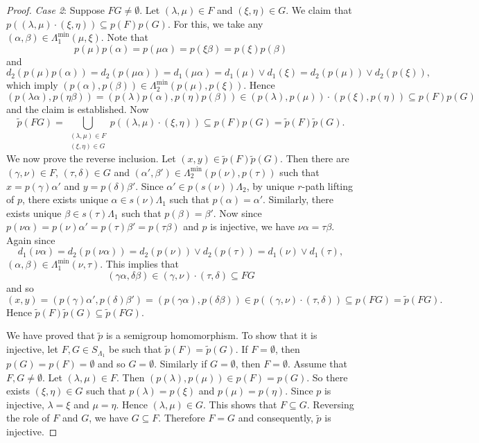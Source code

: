 \documentclass[a4paper,reqno,11pt]{amsart}
\numberwithin{equation}{section}
\theoremstyle{definition}
\theoremstyle{remark}
\begin{document}
\begin{proof}
\emph{Case 2}: Suppose $FG\neq \emptyset$. Let $(\lambda,\mu)\in F$ and $(\xi,\eta)\in G$. We claim that $p\left((\lambda,\mu)\cdot (\xi,\eta)\right)\subseteq p(F)p(G)$. For this, we take any $(\alpha,\beta)\in \Lambda_1^{\min}(\mu,\xi)$. Note that \[p(\mu)p(\alpha)=p(\mu\alpha)=p(\xi\beta)=p(\xi)p(\beta)\] and \[d_2(p(\mu)p(\alpha))=d_2(p(\mu\alpha))=d_1(\mu\alpha)=d_1(\mu)\vee d_1(\xi)=d_2(p(\mu))\vee d_2(p(\xi)),\] which imply $(p(\alpha),p(\beta))\in \Lambda_2^{\min}(p(\mu),p(\xi))$. Hence \[(p(\lambda\alpha),p(\eta\beta))=(p(\lambda)p(\alpha),p(\eta)p(\beta))\in (p(\lambda),p(\mu))\cdot (p(\xi),p(\eta))\subseteq p(F)p(G)\] and the claim is established. Now \[\tilde{p}(FG)=\displaystyle{\bigcup_{\substack{(\lambda,\mu)\in F\\(\xi,\eta)\in G}}}p\left((\lambda,\mu)\cdot (\xi,\eta)\right)\subseteq p(F)p(G)=\tilde{p}(F)\tilde{p}(G).\] We now prove the reverse inclusion. Let $(x,y)\in \tilde{p}(F)\tilde{p}(G)$. Then there are $(\gamma,\nu)\in F$, $(\tau,\delta)\in G$ and $(\alpha',\beta')\in \Lambda_2^{\min}(p(\nu),p(\tau))$ such that $x=p(\gamma)\alpha'$ and $y=p(\delta)\beta'$. Since $\alpha'\in p(s(\nu))\Lambda_2$, by unique $r$-path lifting of $p$, there exists unique $\alpha\in s(\nu)\Lambda_1$ such that $p(\alpha)=\alpha'$. Similarly, there exists unique $\beta\in s(\tau)\Lambda_1$ such that $p(\beta)=\beta'$. Now since $p(\nu\alpha)=p(\nu)\alpha'=p(\tau)\beta'=p(\tau\beta)$ and $p$ is injective, we have $\nu\alpha=\tau\beta$. Again since \[d_1(\nu\alpha)=d_2(p(\nu\alpha))=d_2(p(\nu))\vee d_2(p(\tau))=d_1(\nu)\vee d_1(\tau),\] $(\alpha,\beta)\in \Lambda_1^{\min}(\nu,\tau)$. This implies that \[(\gamma\alpha,\delta\beta)\in (\gamma,\nu)\cdot (\tau,\delta)\subseteq FG\] and so \[(x,y)=(p(\gamma)\alpha',p(\delta)\beta')=(p(\gamma\alpha),p(\delta\beta))\in p\left((\gamma,\nu)\cdot (\tau,\delta)\right)\subseteq p(FG)=\tilde{p}(FG).\] Hence $\tilde{p}(F)\tilde{p}(G)\subseteq \tilde{p}(FG)$. 

We have proved that $\tilde{p}$ is a semigroup homomorphism. To show that it is injective, let $F,G\in S_{\Lambda_1}$ be such that $\tilde{p}(F)=\tilde{p}(G)$. If $F=\emptyset$, then $p(G)=p(F)=\emptyset$ and so $G=\emptyset$. Similarly if $G=\emptyset$, then $F=\emptyset$. Assume that $F,G\neq \emptyset$. Let $(\lambda,\mu)\in F$. Then $(p(\lambda),p(\mu))\in p(F)=p(G)$. So there exists $(\xi,\eta)\in G$ such that $p(\lambda)=p(\xi)$ and $p(\mu)=p(\eta)$. Since $p$ is injective, $\lambda=\xi$ and $\mu=\eta$. Hence $(\lambda,\mu)\in G$. This shows that $F\subseteq G$. Reversing the role of $F$ and $G$, we have $G\subseteq F$. Therefore $F=G$ and consequently, $\tilde{p}$ is injective. 
\end{proof}
\end{document}
